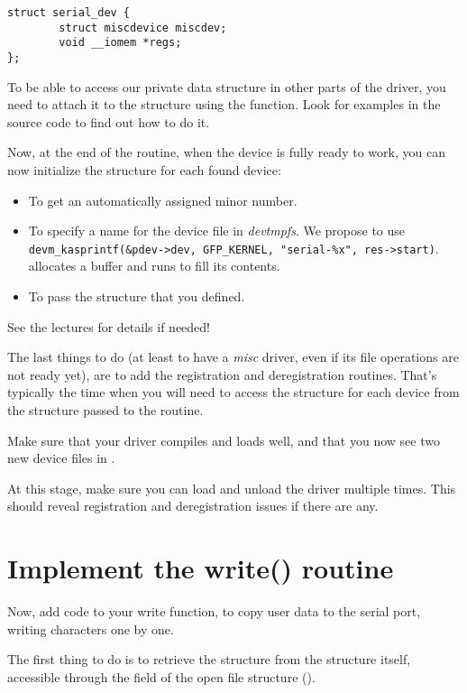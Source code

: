 \begin{verbatim}
struct serial_dev {
        struct miscdevice miscdev;
        void __iomem *regs;
};
\end{verbatim}

To be able to access our private data structure in other parts of the
driver, you need to attach it to the  structure using the
 function. Look for examples in the
source code to find out how to do it.

Now, at the end of the  routine, when the device is fully ready
to work, you can now initialize the  structure
for each found device:

\begin{itemize}
\item To get an automatically assigned minor number.
\item To specify a name for the device file in {\em devtmpfs}. We
  propose to use {\tt devm\_kasprintf(\&pdev->dev, GFP\_KERNEL,
  "serial-\%x", res->start)}.  allocates a
  buffer and runs  to fill its contents.
\item To pass the  structure that you defined.
\end{itemize}

See the lectures for details if needed!

The last things to do (at least to have a {\em misc} driver, even if
its file operations are not ready yet), are to add the registration and
deregistration routines. That's typically the time when you will need
to access the  structure for each device from the
 structure passed to the  routine.

Make sure that your driver compiles and loads well, and that you
now see two new device files in .

At this stage, make sure you can load and unload the driver multiple
times. This should reveal registration and deregistration issues if
there are any.

\section{Implement the write() routine}

Now, add code to your write function, to copy user data to the serial
port, writing characters one by one.

The first thing to do is to retrieve the  structure
from the  structure itself, accessible through the
 field of the open file structure ().

